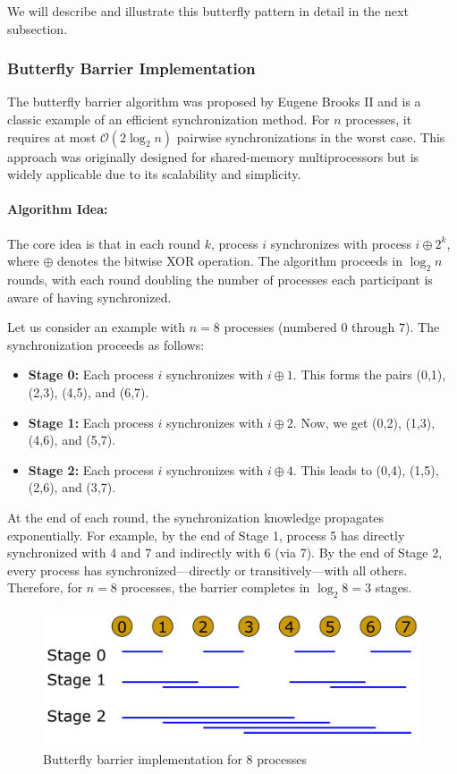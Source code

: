 \documentclass[12pt]{book}
\begin{document}
We will describe and illustrate this butterfly pattern in detail in the next subsection.
\subsubsection{Butterfly Barrier Implementation}

The butterfly barrier algorithm was proposed by Eugene Brooks II and is a classic example of an efficient synchronization method. For $n$ processes, it requires at most $\mathcal{O}(2\log_2 n)$ pairwise synchronizations in the worst case. This approach was originally designed for shared-memory multiprocessors but is widely applicable due to its scalability and simplicity.

\paragraph{Algorithm Idea:}  
The core idea is that in each round $k$, process $i$ synchronizes with process $i \oplus 2^k$, where $\oplus$ denotes the bitwise XOR operation. The algorithm proceeds in $\log_2 n$ rounds, with each round doubling the number of processes each participant is aware of having synchronized.

Let us consider an example with $n = 8$ processes (numbered $0$ through $7$). The synchronization proceeds as follows:

\begin{itemize}
    \item \textbf{Stage 0:} Each process $i$ synchronizes with $i \oplus 1$. This forms the pairs (0,1), (2,3), (4,5), and (6,7).
    \item \textbf{Stage 1:} Each process $i$ synchronizes with $i \oplus 2$. Now, we get (0,2), (1,3), (4,6), and (5,7).
    \item \textbf{Stage 2:} Each process $i$ synchronizes with $i \oplus 4$. This leads to (0,4), (1,5), (2,6), and (3,7).
\end{itemize}

At the end of each round, the synchronization knowledge propagates exponentially. For example, by the end of Stage 1, process 5 has directly synchronized with 4 and 7 and indirectly with 6 (via 7). By the end of Stage 2, every process has synchronized—directly or transitively—with all others. Therefore, for $n=8$ processes, the barrier completes in $\log_2 8 = 3$ stages.

\begin{figure}[ht]
    \centering
    \includegraphics[width=0.6\linewidth]{images/Buttefly_barrier.png}
    \caption{Butterfly barrier implementation for 8 processes}
    \label{fig:butterfuly_barrier}
\end{figure}
\end{document}
